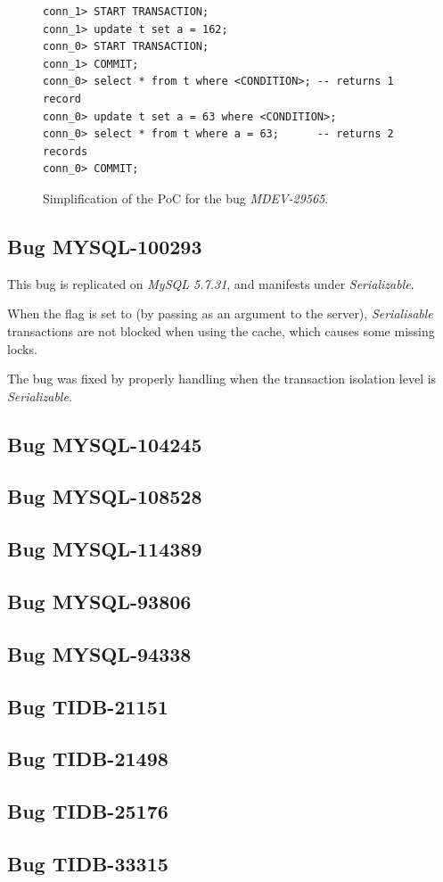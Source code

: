 \begin{figure}
\begin{verbatim}
conn_1> START TRANSACTION;
conn_1> update t set a = 162;
conn_0> START TRANSACTION;
conn_1> COMMIT;
conn_0> select * from t where <CONDITION>; -- returns 1 record
conn_0> update t set a = 63 where <CONDITION>;
conn_0> select * from t where a = 63;      -- returns 2 records
conn_0> COMMIT;
\end{verbatim}
\caption{Simplification of the PoC for the bug \textit{MDEV-29565}.} \label{fig:MDEV-29565}
\end{figure}


\subsection*{Bug MYSQL-100293}

This bug is replicated on \textit{MySQL 5.7.31}, and manifests under \textit{Serializable}.

When the  flag is set to  (by passing  as an argument to the server), \textit{Serialisable} transactions are not blocked when using the cache, which causes some missing locks.

The bug was fixed by properly handling  when the transaction isolation level is \textit{Serializable}.

\subsection*{Bug MYSQL-104245}



\subsection*{Bug MYSQL-108528}
\subsection*{Bug MYSQL-114389}
\subsection*{Bug MYSQL-93806}
\subsection*{Bug MYSQL-94338}
\subsection*{Bug TIDB-21151}
\subsection*{Bug TIDB-21498}
\subsection*{Bug TIDB-25176}
\subsection*{Bug TIDB-33315}

